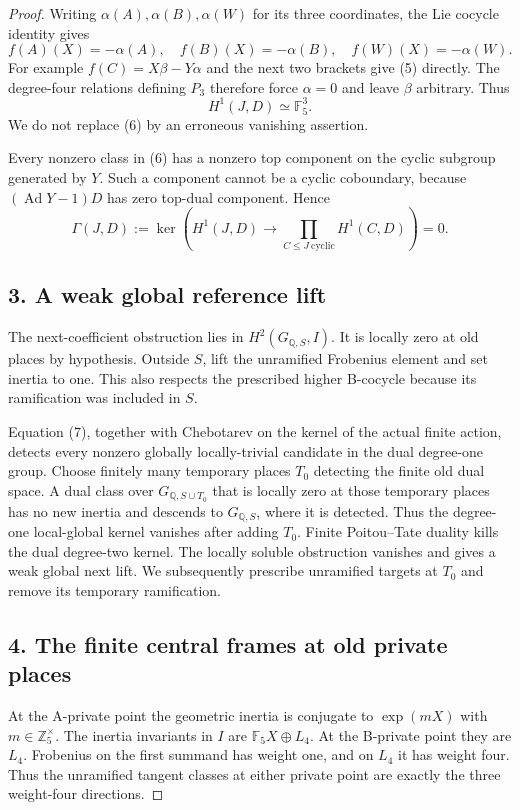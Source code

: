 \documentclass[11pt]{article}
\newcommand{\Z}{\mathbb Z}\newcommand{\F}{\mathbb F}\newcommand{\Q}{\mathbb Q}
\begin{document}
\begin{proof}
Writing $\alpha(A),\alpha(B),\alpha(W)$ for its three coordinates, the Lie cocycle identity gives
\[
 f(A)(X)=-\alpha(A),\quad
 f(B)(X)=-\alpha(B),\quad
 f(W)(X)=-\alpha(W).
 \tag{5}
\]
For example $f(C)=X\beta-Y\alpha$ and the next two brackets give (5) directly. The degree-four relations defining $P_3$ therefore force $\alpha=0$ and leave $\beta$ arbitrary. Thus
\[
 H^1(J,D)\simeq\F_5^3.
 \tag{6}
\]
We do not replace (6) by an erroneous vanishing assertion.

Every nonzero class in (6) has a nonzero top component on the cyclic subgroup generated by $Y$. Such a component cannot be a cyclic coboundary, because $(\operatorname{Ad}Y-1)D$ has zero top-dual component. Hence
\[
 \Gamma(J,D):=
 \ker\!\left(H^1(J,D)\longrightarrow
 \prod_{C\le J\ \mathrm{cyclic}}H^1(C,D)\right)=0.
 \tag{7}
\]

\subsection*{3. A weak global reference lift}
The next-coefficient obstruction lies in $H^2(G_{\Q,S},I)$. It is locally zero at old places by hypothesis. Outside $S$, lift the unramified Frobenius element and set inertia to one. This also respects the prescribed higher B-cocycle because its ramification was included in $S$.

Equation (7), together with Chebotarev on the kernel of the actual finite action, detects every nonzero globally locally-trivial candidate in the dual degree-one group. Choose finitely many temporary places $T_0$ detecting the finite old dual space. A dual class over $G_{\Q,S\cup T_0}$ that is locally zero at those temporary places has no new inertia and descends to $G_{\Q,S}$, where it is detected. Thus the degree-one local-global kernel vanishes after adding $T_0$. Finite Poitou--Tate duality kills the dual degree-two kernel. The locally soluble obstruction vanishes and gives a weak global next lift. We subsequently prescribe unramified targets at $T_0$ and remove its temporary ramification.

\subsection*{4. The finite central frames at old private places}
At the A-private point the geometric inertia is conjugate to $\exp(mX)$ with $m\in\Z_5^\times$. The inertia invariants in $I$ are $\F_5X\oplus L_4$. At the B-private point they are $L_4$. Frobenius on the first summand has weight one, and on $L_4$ it has weight four. Thus the unramified tangent classes at either private point are exactly the three weight-four directions.


\end{proof}
\end{document}
